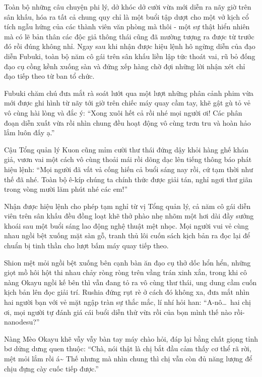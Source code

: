 \documentclass[../main.tex]{subfiles}
\begin{document}
\ct

Toàn bộ những câu chuyện phi lý, dở khóc dở cười vừa mới diễn ra nãy giờ trên sân khấu, hóa ra tất cả chung quy chỉ là một buổi tập dượt cho một vở kịch cổ tích ngẫu hứng của các thành viên văn phòng mà thôi - một sự thật hiển nhiên mà có lẽ bản thân các độc giả thông thái cũng đã mường tượng ra được từ trước đó rồi đúng không nhỉ. Ngay sau khi nhận được hiệu lệnh hô ngừng diễn của đạo diễn Fubuki, toàn bộ năm cô gái trên sân khấu liền lập tức thoát vai, rũ bỏ đống đạo cụ cồng kềnh xuống sàn và đứng xếp hàng chờ đợi những lời nhận xét chỉ đạo tiếp theo từ ban tổ chức.


Fubuki chăm chú đưa mắt rà soát lướt qua một lượt những phân cảnh phim vừa mới được ghi hình từ nãy tới giờ trên chiếc máy quay cầm tay, khẽ gật gù tỏ vẻ vô cùng hài lòng và đắc ý: ``Xong xuôi hết cả rồi nhé mọi người ơi! Các phân đoạn diễn xuất vừa rồi nhìn chung đều hoạt động vô cùng trơn tru và hoàn hảo lắm luôn đấy ạ.''

Cậu Tổng quản lý Kuon cũng mỉm cười thư thái đứng dậy khỏi hàng ghế khán giả, vươn vai một cách vô cùng thoải mái rồi dõng dạc lên tiếng thông báo phát hiệu lệnh: ``Mọi người đã vất vả cống hiến cả buổi sáng nay rồi, cứ tạm thời như thế đã nhé. Toàn bộ ê-kíp chúng ta chính thức được giải tán, nghỉ ngơi thư giãn trong vòng mười lăm phút nhé các em!''

Nhận được hiệu lệnh cho phép tạm nghỉ từ vị Tổng quản lý, cả năm cô gái diễn viên trên sân khấu đều đồng loạt khẽ thở phào nhẹ nhõm một hơi dài đầy sướng khoái sau một buổi sáng lao động nghệ thuật mệt nhọc. Mọi người vui vẻ cùng nhau ngồi bệt xuống mặt sàn gỗ, tranh thủ lôi cuốn sách kịch bản ra đọc lại để chuẩn bị tinh thần cho lượt bấm máy quay tiếp theo.

\omk


Shion mệt mỏi ngồi bệt xuống bên cạnh bàn ăn đạo cụ thở dốc hổn hển, những giọt mồ hôi hột thi nhau chảy ròng ròng trên vầng trán xinh xắn, trong khi cô nàng Okayu ngồi kế bên thì vẫn đang tỏ ra vô cùng thư thái, ung dung cầm cuốn kịch bản lên đọc giải trí. Rushia đứng rụt rè ở cách đó không xa, đưa mắt nhìn hai người bạn với vẻ mặt ngập tràn sự thắc mắc, lí nhí hỏi han: ``A-nô\dots\ hai chị ơi, mọi người tự đánh giá cái buổi diễn thử vừa rồi của bọn mình thế nào rồi-nanodesu?''

Nàng Mèo Okayu khẽ vẫy vẫy bàn tay máy chào hỏi, đáp lại bằng chất giọng tỉnh bơ dửng dưng quen thuộc: ``Chà, nói thật là chị bắt đầu cảm thấy cơ thể rã rời, mệt mỏi lắm rồi á\~{} Thế nhưng mà nhìn chung thì chị vẫn còn đủ năng lượng để chịu đựng cày cuốc tiếp được.''
\end{document}

